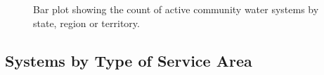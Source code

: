 \documentclass[
  letterpaper,
  DIV=11,
  numbers=noendperiod,
  oneside]{scrartcl}
\begin{document}
\begin{figure}


\caption{\label{fig-statePlot}Bar plot showing the count of active
community water systems by state, region or territory.}

\end{figure}%

\subsection{Systems by Type of Service
Area}\label{systems-by-type-of-service-area}
\end{document}
